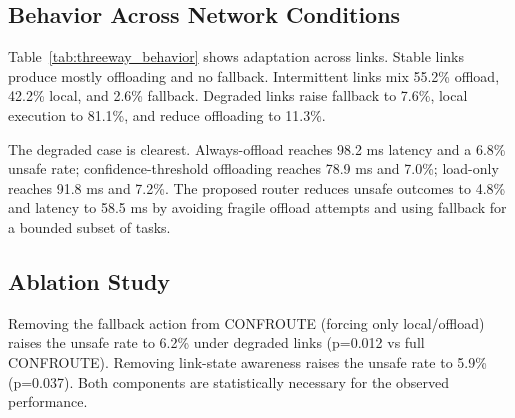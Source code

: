 \documentclass[10pt, conference]{IEEEtran}
\begin{document}
\subsection{Behavior Across Network Conditions}
Table~\ref{tab:threeway_behavior} shows adaptation across links. Stable links produce mostly offloading and no fallback. Intermittent links mix 55.2\% offload, 42.2\% local, and 2.6\% fallback. Degraded links raise fallback to 7.6\%, local execution to 81.1\%, and reduce offloading to 11.3\%.
\begin{table}[!http]
\centering
\caption{Three-way router behavior across network conditions}
\label{tab:threeway_behavior}
\scalebox{.8}{
\begin{tabular}{@{}lrrrrrr@{}}
\toprule
\textbf{Scenario} & \textbf{Lat.} & \textbf{Unsafe} & \textbf{Energy} & \textbf{Local} & \textbf{Offload} & \textbf{Fallback} \\
 & \textbf{(ms)} & \textbf{Rate} & \textbf{(J)} & \textbf{Rate} & \textbf{Rate} & \textbf{Rate} \\
\midrule
Stable & 33.5 & 1.5\% & 0.59 & 10.7\% & 89.3\% & 0.0\% \\
Intermittent & 61.6 & 4.4\% & 0.56 & 42.2\% & 55.2\% & 2.6\% \\
Degraded & 58.5 & 4.8\% & 0.50 & 81.1\% & 11.3\% & 7.6\% \\
\bottomrule
\end{tabular}
}
\end{table}
The degraded case is clearest. Always-offload reaches 98.2 ms latency and a 6.8\% unsafe rate; confidence-threshold offloading reaches 78.9 ms and 7.0\%; load-only reaches 91.8 ms and 7.2\%. The proposed router reduces unsafe outcomes to 4.8\% and latency to 58.5 ms by avoiding fragile offload attempts and using fallback for a bounded subset of tasks.

\subsection{Ablation Study}
Removing the fallback action from CONFROUTE (forcing only local/offload) raises the unsafe rate to 6.2\% under degraded links (p=0.012 vs full CONFROUTE). Removing link-state awareness raises the unsafe rate to 5.9\% (p=0.037). Both components are statistically necessary for the observed performance.

\end{document}

